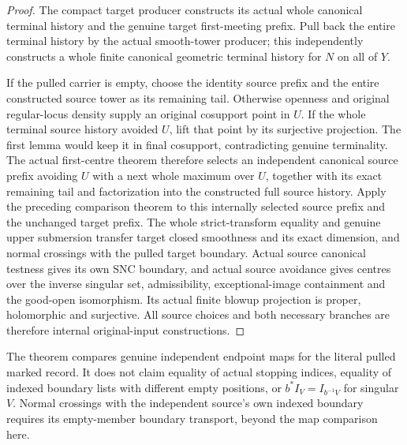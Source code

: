 \begin{proof}
The compact target producer constructs its actual whole canonical
terminal history and the genuine target first-meeting prefix.  Pull
back the entire terminal history by the actual smooth-tower producer;
this independently constructs a whole finite canonical geometric
terminal history for $N$ on all of $Y$.

If the pulled carrier is empty, choose the identity source prefix and
the entire constructed source tower as its remaining tail.  Otherwise
openness and original regular-locus density supply an original
cosupport point in $U$.  If the whole terminal source history avoided
$U$, lift that point by its surjective projection.  The first lemma
would keep it in final cosupport, contradicting genuine terminality.
The actual first-centre theorem therefore selects an independent
canonical source prefix avoiding $U$ with a next whole maximum over
$U$, together with its exact remaining tail and factorization into the
constructed full source history.  Apply the preceding comparison
theorem to this internally selected source prefix and the unchanged
target prefix.  The whole strict-transform equality and genuine upper
submersion transfer target closed smoothness and its exact dimension,
and normal crossings with the pulled target boundary.  Actual source
canonical testness gives its own SNC boundary, and actual source
avoidance gives centres over the inverse singular set, admissibility,
exceptional-image containment and the good-open isomorphism.  Its actual
finite blowup projection is proper, holomorphic and surjective.  All
source choices and both necessary branches are therefore internal
original-input constructions.
\end{proof}

\begin{remark}
The theorem compares genuine independent endpoint maps for the literal
pulled marked record.  It does not claim equality of actual stopping
indices, equality of indexed boundary lists with different empty
positions, or $b^*I_V=I_{b^{-1}V}$ for singular $V$.  Normal crossings
with the independent source's own indexed boundary requires its
empty-member boundary transport, beyond the map comparison here.
\end{remark}
